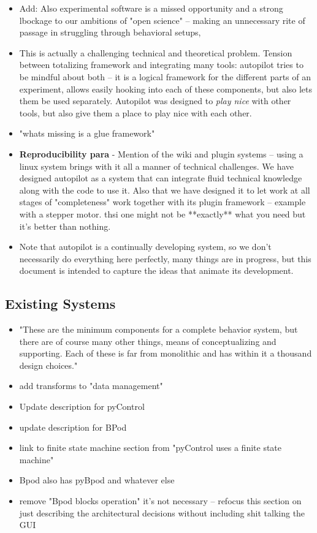 \begin{itemize}
\item Add: Also experimental software is a missed opportunity and a strong lbockage to our ambitions of "open science" -- making an unnecessary rite of passage in struggling through behavioral setups, 
\item This is actually a challenging technical and theoretical problem. Tension between totalizing framework and integrating many tools: autopilot tries to be mindful about both -- it is a logical framework for the different parts of an experiment, allows easily hooking into each of these components, but also lets them be used separately. Autopilot was designed to \textit{play nice} with other tools, but also give them a place to play nice with each other.
\item "whats missing is a glue framework"
\item \textbf{Reproducibility para} - Mention of the wiki and plugin systems -- using a linux system brings with it all a manner of technical challenges. We have designed autopilot as a system that can integrate fluid technical knowledge along with the code to use it. Also that we have designed it to let work at all stages of "completeness" work together with its plugin framework -- example with a stepper motor. thsi one might not be **exactly** what you need but it's better than nothing.
\item Note that autopilot is a continually developing system, so we don't necessarily do everything here perfectly, many things are in progress, but this document is intended to capture the ideas that animate its development.
\end{itemize}

\subsection{Existing Systems}

\begin{itemize}
	\item "These are the minimum components for a complete behavior system, but there are of course many other things, means of conceptualizing and supporting. Each of these is far from monolithic and has within it a thousand design choices."
	\item add transforms to "data management"
	\item Update description for pyControl
	\item update description for BPod
	\item link to finite state machine section from "pyControl uses a finite state machine"
	\item Bpod also has pyBpod and whatever else
	\item remove "Bpod blocks operation" it's not necessary -- refocus this section on just describing the architectural decisions without including shit talking the GUI
\end{itemize}

